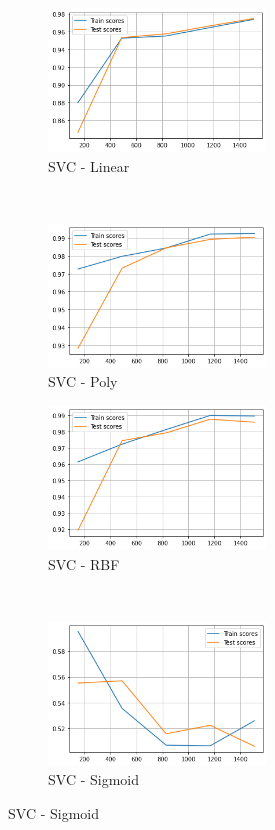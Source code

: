 \documentclass{article}
\begin{document}
\begin{figure}[htb!]
    \centering
    \begin{subfigure}[t]{0.5\textwidth}
        \centering
        \includegraphics[height=1.5in]{img/momentum-classification/learning-curves/svc-linear}
        \caption{SVC - Linear}
    \end{subfigure}%
    ~ 
    \begin{subfigure}[t]{0.5\textwidth}
        \centering
        \includegraphics[height=1.5in]{img/momentum-classification/learning-curves/svc-poly}
        \caption{SVC - Poly}
    \end{subfigure}

    \centering
    \begin{subfigure}[t]{0.5\textwidth}
        \centering
        \includegraphics[height=1.5in]{img/momentum-classification/learning-curves/svc-rbf}
        \caption{SVC - RBF}
    \end{subfigure}%
    ~ 
    \begin{subfigure}[t]{0.5\textwidth}
        \centering
        \includegraphics[height=1.5in]{img/momentum-classification/learning-curves/svc-sigmoid}
        \caption{SVC - Sigmoid}
    \end{subfigure}


\end{figure}
\end{document}
